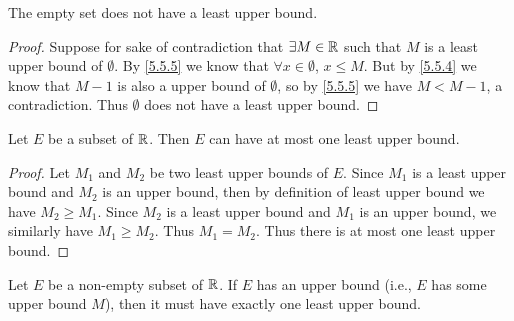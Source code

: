 \setcounter{thm}{6}
\begin{eg}\label{5.5.7}
  The empty set does not have a least upper bound.
\end{eg}

\begin{proof}
  Suppose for sake of contradiction that \(\exists M \in \mathbb{R}\) such that \(M\) is a least upper bound of \(\emptyset\).
  By \cref{5.5.5} we know that \(\forall x \in \emptyset\), \(x \leq M\).
  But by \cref{5.5.4} we know that \(M - 1\) is also a upper bound of \(\emptyset\), so by \cref{5.5.5} we have \(M < M - 1\), a contradiction.
  Thus \(\emptyset\) does not have a least upper bound.
\end{proof}

\begin{prop}\label{5.5.8}
  Let \(E\) be a subset of \(\mathbb{R}\).
  Then \(E\) can have at most one least upper bound.
\end{prop}

\begin{proof}
  Let \(M_1\) and \(M_2\) be two least upper bounds of \(E\).
  Since \(M_1\) is a least upper bound and \(M_2\) is an upper bound, then by definition of least upper bound we have \(M_2 \geq M_1\).
  Since \(M_2\) is a least upper bound and \(M_1\) is an upper bound, we similarly have \(M_1 \geq M_2\).
  Thus \(M_1 = M_2\).
  Thus there is at most one least upper bound.
\end{proof}

\begin{thm}\label{5.5.9}
  Let \(E\) be a non-empty subset of \(\mathbb{R}\).
  If \(E\) has an upper bound (i.e., \(E\) has some upper bound \(M\)), then it must have exactly one least upper bound.
\end{thm}

